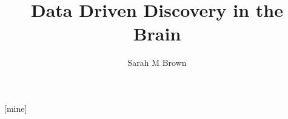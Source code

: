 \documentclass{beamer}
\title[]{Data Driven Discovery in the Brain}
\subtitle{}
\author[]{Sarah M Brown}
\date{}
\begin{document}
[mine]


\begin{frame}
  \titlepage
\end{frame}
\end{document}
